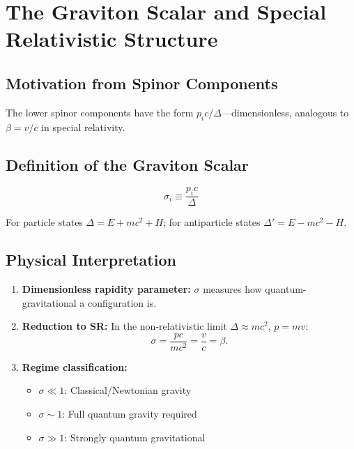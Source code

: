 \documentclass[11pt,a4paper]{article}
\theoremstyle{definition}
\theoremstyle{remark}
\begin{document}
	\section{The Graviton Scalar and Special Relativistic Structure}
	\label{sec:graviton_scalar}
	
	\subsection{Motivation from Spinor Components}
	
	The lower spinor components have the form $p_ic/\Delta$---dimensionless, analogous to $\beta=v/c$ in special relativity.
	
	\subsection{Definition of the Graviton Scalar}
	
	\begin{equation}
		\boxed{\sigma_i \equiv \frac{p_i c}{\Delta}}
		\label{eq:graviton_scalar}
	\end{equation}
	
	For particle states $\Delta=E+mc^2+H$; for antiparticle states $\Delta'=E-mc^2-H$.
	
	\subsection{Physical Interpretation}
	
	\begin{enumerate}
		\item \textbf{Dimensionless rapidity parameter:} $\sigma$ measures how quantum-gravitational a configuration is.
		\item \textbf{Reduction to SR:} In the non-relativistic limit $\Delta\approx mc^2$, $p=mv$:
		\begin{equation}
			\sigma = \frac{pc}{mc^2} = \frac{v}{c} = \beta.
		\end{equation}
		\item \textbf{Regime classification:}
		\begin{itemize}
			\item $\sigma\ll1$: Classical/Newtonian gravity
			\item $\sigma\sim1$: Full quantum gravity required
			\item $\sigma\gg1$: Strongly quantum gravitational
		\end{itemize}
	\end{enumerate}
	
\end{document}
